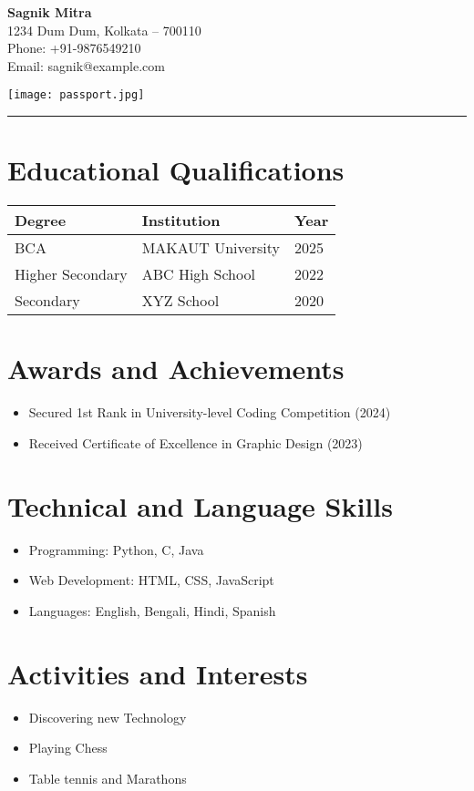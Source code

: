 \documentclass[a4paper,12pt]{article}
\begin{document}
\begin{minipage}{0.7\textwidth}
    \LARGE{\textbf{Sagnik Mitra}} \\
    \normalsize
    1234 Dum Dum, Kolkata – 700110 \\
    Phone: +91-9876549210 \\
    Email: sagnik@example.com
\end{minipage}
\hfill
\begin{minipage}{0.25\textwidth}
    \texttt{[image: passport.jpg]} 
\end{minipage}

\vspace{0.5cm}
\hrule
\vspace{0.5cm}

\section*{Educational Qualifications}
\begin{tabular}{|m{4cm}|m{5cm}|m{3cm}|}
\hline
\textbf{Degree} & \textbf{Institution} & \textbf{Year} \\
\hline
BCA & MAKAUT University & 2025 \\
\hline
Higher Secondary & ABC High School & 2022 \\
\hline
Secondary & XYZ School & 2020 \\
\hline
\end{tabular}

\vspace{0.5cm}

\section*{Awards and Achievements}
\begin{itemize}
    \item Secured 1st Rank in University-level Coding Competition (2024)
    \item Received Certificate of Excellence in Graphic Design (2023)
\end{itemize}

\section*{Technical and Language Skills}
\begin{itemize}
    \item Programming: Python, C, Java
    \item Web Development: HTML, CSS, JavaScript
    \item Languages: English, Bengali, Hindi, Spanish
\end{itemize}

\section*{Activities and Interests}
\begin{itemize}
    \item Discovering new Technology
    \item Playing Chess
    \item Table tennis and Marathons
\end{itemize}
\end{document}
